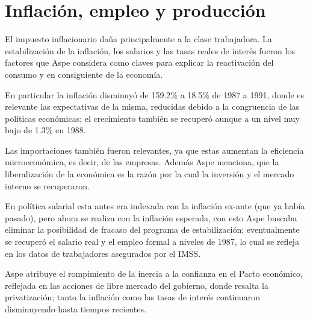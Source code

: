 \section{Inflación, empleo y producción}
El impuesto inflacionario daña principalmente a la clase trabajadora. La estabilización de la inflación, los salarios y las tasas reales de interés fueron los factores que Aspe considera como claves para explicar la reactivación del consumo y en consiguiente de la economía.

En particular la inflación disminuyó de 159.2\% a 18.5\% de 1987 a 1991, donde es relevante las expectativas de la misma, reducidas debido a la congruencia de las políticas económicas; el crecimiento también se recuperó aunque a un nivel muy bajo de 1.3\% en 1988.

Las importaciones también fueron relevantes, ya que estas aumentan la eficiencia microeconómica, es decir, de las empresas. Además Aspe menciona, que la liberalización de la económica es la razón por la cual la inversión y el mercado interno se recuperaron.

En política salarial esta antes era indexada con la inflación ex-ante (que ya había pasado), pero ahora se realiza con la inflación esperada, con esto Aspe buscaba eliminar la posibilidad de fracaso del programa de estabilización; eventualmente se recuperó el salario real y el empleo formal a niveles de 1987, lo cual se refleja en los datos de trabajadores asegurados por el IMSS.

Aspe atribuye el rompimiento de la inercia a la confianza en el Pacto económico, reflejada en las acciones de libre mercado del gobierno, donde resalta la privatización; tanto la inflación como las tasas de interés continuaron disminuyendo hasta tiempos recientes.

